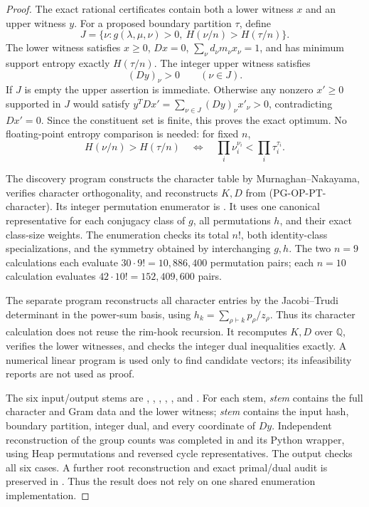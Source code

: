 \begin{proof}
The exact rational certificates contain both a lower witness $x$ and an
upper witness $y$. For a proposed boundary partition $\tau$, define
\[
 J=\{\nu:g(\lambda,\mu,\nu)>0,
                    \ H(\nu/n)>H(\tau/n)\}.
\]
The lower witness satisfies $x\geq0$, $Dx=0$,
$\sum_\nu d_\nu m_\nu x_\nu=1$, and has minimum support entropy exactly
$H(\tau/n)$. The integer upper witness satisfies
\[
 (Dy)_\nu>0\qquad(\nu\in J).
 \tag{PG-OP-PT-dual}
\]
If $J$ is empty the upper assertion is immediate. Otherwise any nonzero
$x'\geq0$ supported in $J$ would satisfy
$y^TDx'=\sum_{\nu\in J}(Dy)_\nu x'_\nu>0$, contradicting $Dx'=0$.
Since the constituent set is finite, this proves the exact optimum.
No floating-point entropy comparison is needed: for fixed $n$,
\[
 H(\nu/n)>H(\tau/n)
 \quad\Longleftrightarrow\quad
 \prod_i\nu_i^{\nu_i}<\prod_i\tau_i^{\tau_i}.
\]

The discovery program  constructs the
character table by Murnaghan--Nakayama, verifies character orthogonality,
and reconstructs $K,D$ from (PG-OP-PT-character). Its integer permutation
enumerator is . It uses one canonical
representative for each conjugacy class of $g$, all permutations $h$,
and their exact class-size weights. The enumeration checks its total
$n!$, both identity-class specializations, and the symmetry obtained by
interchanging $g,h$. The two $n=9$ calculations each evaluate
$30\cdot9!=10{,}886{,}400$ permutation pairs; each $n=10$ calculation
evaluates $42\cdot10!=152{,}409{,}600$ pairs.

The separate program  reconstructs
all character entries by the Jacobi--Trudi determinant in the power-sum
basis, using $h_k=\sum_{\rho\vdash k}p_\rho/z_\rho$. Thus its character
calculation does not reuse the rim-hook recursion. It recomputes $K,D$
over $\mathbb Q$, verifies the lower witnesses, and checks the integer
dual inequalities exactly. A numerical linear program is used only to
find candidate vectors; its infeasibility reports are not used as proof.

The six input/output stems are
, ,
, ,
, and
.
For each stem, \emph{stem} contains the full
character and Gram data and the lower witness;
\emph{stem} contains the input
hash, boundary partition, integer dual, and every coordinate of $Dy$.
Independent reconstruction of the group counts was completed in
 and its Python wrapper,
using Heap permutations and reversed cycle representatives. The output
 checks all six cases.
A further root reconstruction and exact primal/dual audit is preserved in
. Thus the result does
not rely on one shared enumeration implementation.
\end{proof}


